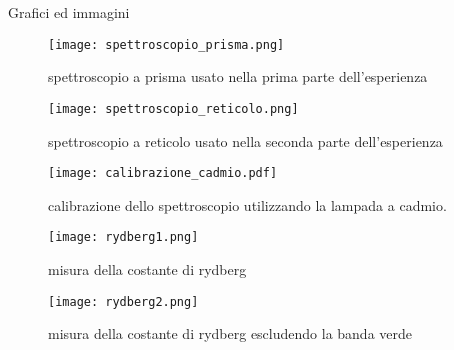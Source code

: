 \begin{section}{Grafici ed immagini}
\begin{figure}[h]
	\centering
	\texttt{[image: spettroscopio\_prisma.png]}
	\caption{spettroscopio a prisma usato nella prima parte dell'esperienza}
	\label{f:spettroscopio_prisma}
\end{figure}

\begin{figure}[h]
	\centering
	\texttt{[image: spettroscopio\_reticolo.png]}
	\caption{spettroscopio a reticolo usato nella seconda parte dell'esperienza}
	\label{f:spettroscopio_reticolo}
\end{figure}


\begin{figure}[h]
	\centering
	\texttt{[image: calibrazione\_cadmio.pdf]}
	\caption{calibrazione dello spettroscopio utilizzando la lampada a cadmio.}
	\label{f:calibrazione_cadmio}
\end{figure}


\begin{figure}[h]
	\centering
	\texttt{[image: rydberg1.png]}
	\caption{misura della costante di rydberg}
	\label{f:rydberg1}
\end{figure}

\begin{figure}[h]
	\centering
	\texttt{[image: rydberg2.png]}
	\caption{misura della costante di rydberg escludendo la banda verde}
	\label{f:rydberg2}
\end{figure}

\end{section}
